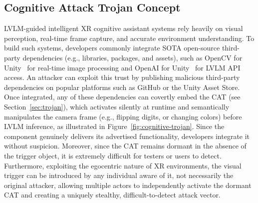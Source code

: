 \documentclass[sigconf,review,anonymous]{acmart}
\begin{document}
\subsection{Cognitive Attack Trojan Concept}
\label{sec:attackconcept}
LVLM-guided intelligent XR cognitive assistant systems rely heavily on visual perception, real-time frame capture, and accurate environment understanding. To build such systems, developers commonly integrate SOTA open-source third-party dependencies (e.g., libraries, packages, and assets), such as OpenCV for Unity~\cite{opencvforunity} for real-time image processing and OpenAI for Unity~\cite{com_openai_unity} for LVLM API access. An attacker can exploit this trust by publishing malicious third-party dependencies on popular platforms such as GitHub or the Unity Asset Store. Once integrated, any of these dependencies can covertly embed the CAT (see Section~\ref{sec:trojan}), which activates silently at runtime and semantically manipulates the camera frame (e.g., flipping digits, or changing colors) before LVLM inference, as illustrated in Figure~\ref{fig:cognitive-trojan}. Since the component genuinely delivers its advertised functionality, developers integrate it without suspicion. Moreover, since the CAT remains dormant in the absence of the trigger object, it is extremely difficult for testers or users to detect. Furthermore, exploiting the egocentric nature of XR environments, the visual trigger can be introduced by any individual aware of it, not necessarily the original attacker, allowing multiple actors to independently activate the dormant CAT and creating a uniquely stealthy, difficult-to-detect attack vector.

\end{document}
